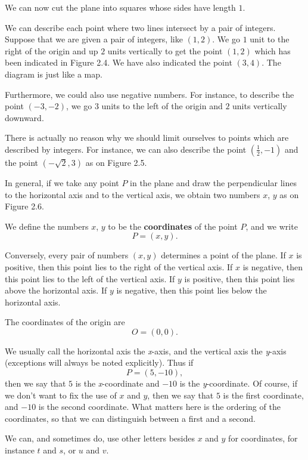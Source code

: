 \documentclass[12pt]{book} %
\begin{document}
We can now cut the plane into squares whose sides have length $1$.


We can describe each point where two lines intersect by a pair of integers. Suppose that we are given a pair of integers, like $(1,2)$. We go $1$ unit to the right of the origin and up $2$ units vertically to get the point $(1,2)$ which has been indicated in Figure 2.4. We have also indicated the point $(3,4)$. The diagram is just like a map.

Furthermore, we could also use negative numbers. For instance, to describe the point $(-3,-2)$, we go $3$ units to the left of the origin and $2$ units vertically downward.

There is actually no reason why we should limit ourselves to points which are described by integers. For instance, we can also describe the point $\left(\frac12,-1\right)$ and the point $(-\sqrt{2},3)$ as on Figure 2.5.


In general, if we take any point $P$ in the plane and draw the perpendicular lines to the horizontal axis and to the vertical axis, we obtain two numbers $x$, $y$ as on Figure 2.6.


We define the numbers $x$, $y$ to be the \textbf{coordinates} of the point $P$, and we write
\[
P=(x,y).
\]

Conversely, every pair of numbers $(x,y)$ determines a point of the plane. If $x$ is positive, then this point lies to the right of the vertical axis. If $x$ is negative, then this point lies to the left of the vertical axis. If $y$ is positive, then this point lies above the horizontal axis. If $y$ is negative, then this point lies below the horizontal axis.

The coordinates of the origin are
\[
O=(0,0).
\]

We usually call the horizontal axis the \textit{x}-axis, and the vertical axis the \textit{y}-axis (exceptions will always be noted explicitly). Thus if
\[
P=(5,-10),
\]
then we say that $5$ is the \textit{x}-coordinate and $-10$ is the \textit{y}-coordinate. Of course, if we don't want to fix the use of $x$ and $y$, then we say that $5$ is the first coordinate, and $-10$ is the second coordinate. What matters here is the ordering of the coordinates, so that we can distinguish between a first and a second.

We can, and sometimes do, use other letters besides $x$ and $y$ for coordinates, for instance $t$ and $s$, or $u$ and $v$.
\end{document}
